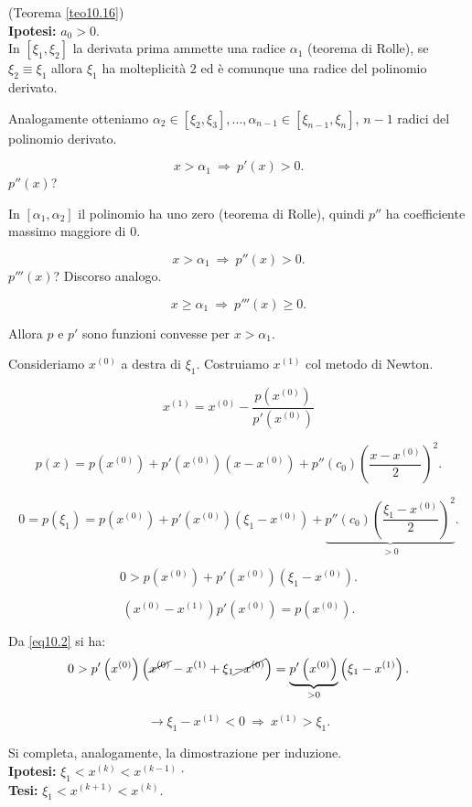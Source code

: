 \begin{dimo}(Teorema \ref{teo10.16})\\

\textbf{Ipotesi:} $a_0 > 0$.\\

In $[\xi_1, \xi_2]$ la derivata prima ammette una radice $\alpha_1$ (teorema 
di Rolle),
se $\xi_2 \equiv \xi_1$ allora $\xi_1$ ha molteplicità $2$ ed è comunque una
radice del polinomio derivato.

Analogamente otteniamo $\alpha_2 \in [\xi_2, \xi_3], \ldots, \alpha_{n-1}
\in [\xi_{n-1}, \xi_n]$, $n-1$ radici del polinomio derivato. 

\[x > \alpha_1\ \Rightarrow\ p'(x) > 0 .\]
$p''(x)$?

In $[\alpha_1, \alpha_2]$ il polinomio ha uno zero (teorema di Rolle), quindi
$p''$ ha coefficiente massimo maggiore di $0$.

\[x > \alpha_1\ \Rightarrow\ p''(x) > 0 .\]
$p'''(x)$? Discorso analogo.

\[x \geq \alpha_1\ \Rightarrow\ p'''(x) \geq 0 .\]

Allora $p$ e $p'$ sono funzioni convesse per $x > \alpha_1$.

Consideriamo $x^{(0)}$ a destra di $\xi_1$. Costruiamo $x^{(1)}$ col metodo di
Newton.

\begin{equation}\label{eq10.2}
x^{(1)} = x^{(0)} - \frac{p(x^{(0)})}{p'(x^{(0)})}
\end{equation}

\[
p(x) = p\left(x^{(0)}\right) + p'\left(x^{(0)}\right)\left(x-x^{(0)}\right) 
+ p''(c_0)\left(\frac{x-x^{(0)}}{2}
\right)^2.
\]

\[
0 = p(\xi_1) = p\left(x^{(0)}\right)+
p'\left(x^{(0)}\right)\left(\xi_1-x^{(0)}\right) 
+ \underbrace{p''(c_0)\left(\frac{\xi_1-x^{(0)}}{2}\right)^2}_{>0}.
\]

\[
0 > p\left(x^{(0)}\right)+p'\left(x^{(0)}\right)\left(\xi_1-x^{(0)}\right).
\]

\[
\left(x^{(0)}-x^{(1)}\right)p'\left(x^{(0)}\right) = p\left(x^{(0)}\right).
\]

Da \ref{eq10.2} si ha:
\[
0 > p'\left(x^{(0)}\right)\left(
\cancel{x^{(0)}} -x^{(1)} + \xi_1 \cancel{- x^{(0)}}
\right) = \underbrace{p'\left(x^{(0)}\right)}_{>0}\left(\xi_1 - x^{(1)}\right).
\]

\[
\longrightarrow \xi_1 - x^{(1)} < 0 \ \Rightarrow \ x^{(1)} > \xi_1.
\]

Si completa, analogamente, la dimostrazione per induzione.\\

\textbf{Ipotesi: } $\xi_1 < x^{(k)} < x^{(k-1)}$·\\

\textbf{Tesi: } $\xi_1 < x^{(k+1)} < x^{(k)}$.
\end{dimo}

